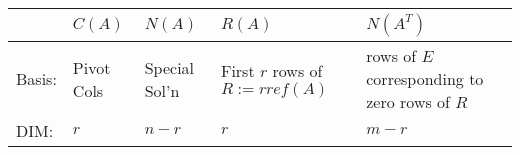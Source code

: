 \documentclass[a4paper,12pt]{article}
\begin{document}
\begin{tabularx}{\linewidth}[t]{|l|l|l|X|X|}
		\hline
		& $C(A)$ & $N(A)$ & $R(A)$ & $N(A^T)$ \\
		\hline
		Basis: & Pivot Cols & Special Sol'n & First $r$ rows of $R:=rref(A)$ & rows of $E$ corresponding to zero rows of $R$\\
		\hline
		DIM: & $r$ & $n-r$ & $r$ & $m-r$ \\
		\hline
		\end{tabularx}		
\end{document}
